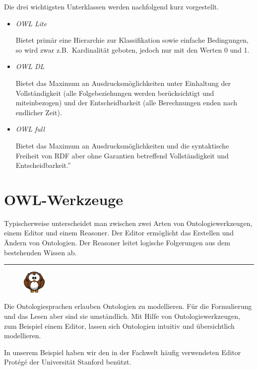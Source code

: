 Die drei wichtigsten Unterklassen werden nachfolgend kurz vorgestellt.
\begin{itemize}
    \item \textit{OWL Lite}

        Bietet primär eine Hierarchie zur Klassifikation sowie einfache Bedingungen, so wird zwar z.B.\ Kardinalität geboten, jedoch nur mit den Werten 0 und 1.~\cite{w3owl}

    \item{\textit{OWL DL}}

        Bietet das Maximum an Ausdrucksmöglichkeiten unter Einhaltung der Vollständigkeit (alle Folgebeziehungen werden berücksichtigt und miteinbezogen) und der Entscheidbarkeit (alle Berechnungen enden nach endlicher Zeit).~\cite{w3owl}

    \item{\textit{OWL full}}

        Bietet das Maximum an Ausdrucksmöglichkeiten und die syntaktische Freiheit von RDF aber ohne Garantien betreffend Vollständigkeit und Entscheidbarkeit.''~\cite{w3owl}

\end{itemize}

\section{OWL-Werkzeuge}
\label{sec:owl_owl_OwlTools}
Typischerweise unterscheidet man zwischen zwei Arten von Ontologiewerkzeugen, einem Editor und einem Reasoner. Der Editor ermöglicht das Erstellen und Ändern von Ontologien. Der Reasoner leitet logische Folgerungen aus dem bestehenden Wissen ab.

\noindent\rule[1ex]{\textwidth}{1pt}
\begin{figure}
    \vspace{-19pt}
    \includegraphics[width=0.1\textwidth]{bilder/owl.png}
\end{figure}
Die Ontologiesprachen erlauben Ontologien zu modellieren. Für die Formulierung und das Lesen aber sind sie umständlich. Mit Hilfe von Ontologiewerkzeugen, zum Beispiel einem Editor, lassen sich Ontologien intuitiv und übersichtlich modellieren.

In unserem Beispiel haben wir den in der Fachwelt häufig verwendeten Editor Protégé der Universität Stanford benützt.

